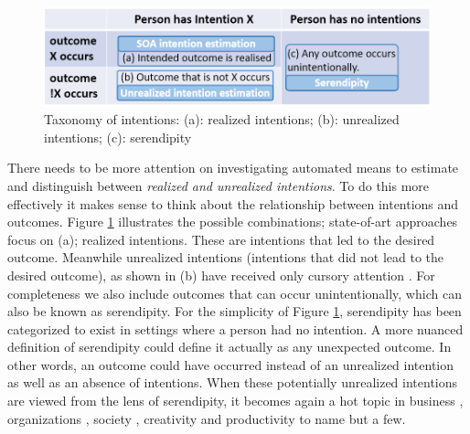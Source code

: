 \documentclass[sigconf]{acmart}
\begin{document}
\begin{figure}[tb]
    \includegraphics[width=\columnwidth]{IntentQuad.png}
    \vspace{-5mm}
    \caption{Taxonomy of intentions: (a): realized intentions; (b): unrealized intentions; (c): serendipity}
    \vspace{-5mm}
    \label{fig:intent}
\end{figure}
There needs to be more attention on investigating automated means to estimate and distinguish between \emph{realized and unrealized intentions}. To do this more effectively it makes sense to think about the relationship between intentions and outcomes. Figure \ref{fig:intent} illustrates the possible combinations; state-of-art approaches focus on (a); realized intentions. These are intentions that led to the desired outcome. Meanwhile unrealized intentions (intentions that did not lead to the desired outcome), as shown in (b) have received only cursory attention \cite{wlodarczak2020breathing,Rasouli2019PIE}. For completeness we also include outcomes that can occur unintentionally, which can also be known as serendipity. For the simplicity of Figure \ref{fig:intent}, serendipity has been categorized to exist in settings where a person had no intention. A more nuanced definition of serendipity could define it actually as any unexpected outcome. In other words, an outcome could have occurred instead of an unrealized intention as well as an absence of intentions. When these potentially unrealized intentions are viewed from the lens of serendipity, it becomes again a hot topic in business \cite{Busch2020,Lane2021}, organizations \cite{eagle2004can,10.1145/2531602.2531641}, society \cite{Chan2019}, creativity and productivity \cite{gratton2020increase,meluso2020making} to name but a few. 
\end{document}
